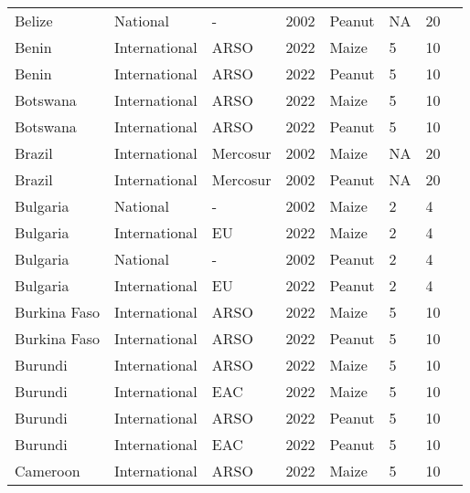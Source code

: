 \begin{landscape}
\begin{longtable}[c]{llllllll}
Belize            & National      & -        & 2002 & Peanut & NA & 20 & \citet{van2004worldwide}     \\
Benin             & International & ARSO     & 2022 & Maize  & 5  & 10 & \citet{ARSO2022}             \\
Benin             & International & ARSO     & 2022 & Peanut & 5  & 10 & \citet{ARSO2022}             \\
Botswana          & International & ARSO     & 2022 & Maize  & 5  & 10 & \citet{ARSO2022}             \\
Botswana          & International & ARSO     & 2022 & Peanut & 5  & 10 & \citet{ARSO2022}             \\
Brazil            & International & Mercosur & 2002 & Maize  & NA & 20 & \citet{MERCOSUR2002}         \\
Brazil            & International & Mercosur & 2002 & Peanut & NA & 20 & \citet{MERCOSUR2002}         \\
Bulgaria          & National      & -        & 2002 & Maize  & 2  & 4  & \citet{van2004worldwide}     \\
Bulgaria          & International & EU       & 2022 & Maize  & 2  & 4  & \citet{EC2010}               \\
Bulgaria          & National      & -        & 2002 & Peanut & 2  & 4  & \citet{van2004worldwide}     \\
Bulgaria          & International & EU       & 2022 & Peanut & 2  & 4  & \citet{EC2010}               \\
Burkina Faso      & International & ARSO     & 2022 & Maize  & 5  & 10 & \citet{ARSO2022}             \\
Burkina Faso      & International & ARSO     & 2022 & Peanut & 5  & 10 & \citet{ARSO2022}             \\
Burundi           & International & ARSO     & 2022 & Maize  & 5  & 10 & \citet{ARSO2022}             \\
Burundi           & International & EAC      & 2022 & Maize  & 5  & 10 & \citet{EAC2018}              \\
Burundi           & International & ARSO     & 2022 & Peanut & 5  & 10 & \citet{ARSO2022}             \\
Burundi           & International & EAC      & 2022 & Peanut & 5  & 10 & \citet{EAC2018}              \\
Cameroon          & International & ARSO     & 2022 & Maize  & 5  & 10 & \citet{ARSO2022}             \\

\end{longtable}
\end{landscape}
